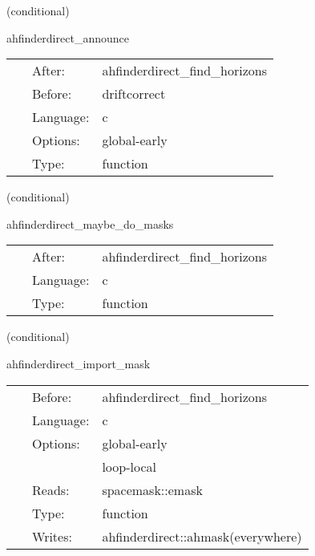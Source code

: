 \vspace{5mm}

   (conditional) 

\hspace{5mm} ahfinderdirect\_announce 

\hspace{5mm}{\it announce horizon position(s) to other thorns } 


\hspace{5mm}

 \begin{tabular*}{160mm}{cll} 
~ & After:  & ahfinderdirect\_find\_horizons \\ 
~ & Before:  & driftcorrect \\ 
~ & Language:  & c \\ 
~ & Options:  & global-early \\ 
~ & Type:  & function \\ 
\end{tabular*} 


\vspace{5mm}

   (conditional) 

\hspace{5mm} ahfinderdirect\_maybe\_do\_masks 

\hspace{5mm}{\it set mask(s) based on apparent horizon position(s) } 


\hspace{5mm}

 \begin{tabular*}{160mm}{cll} 
~ & After:  & ahfinderdirect\_find\_horizons \\ 
~ & Language:  & c \\ 
~ & Type:  & function \\ 
\end{tabular*} 


\vspace{5mm}

   (conditional) 

\hspace{5mm} ahfinderdirect\_import\_mask 

\hspace{5mm}{\it import the excision mask } 


\hspace{5mm}

 \begin{tabular*}{160mm}{cll} 
~ & Before:  & ahfinderdirect\_find\_horizons \\ 
~ & Language:  & c \\ 
~ & Options:  & global-early \\ 
~& ~ &loop-local\\ 
~ & Reads:  & spacemask::emask \\ 
~ & Type:  & function \\ 
~ & Writes:  & ahfinderdirect::ahmask(everywhere) \\ 
\end{tabular*} 


